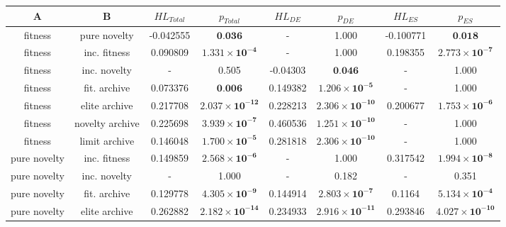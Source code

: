 \begin{tabular}{cccccccc}
\toprule
              A &               B & ${HL}_{Total}$ &                      $p_{Total}$ & ${HL}_{DE}$ &                         $p_{DE}$ & ${HL}_{ES}$ &                         $p_{ES}$ \\
\midrule
        fitness &    pure novelty &      -0.042555 &                 $\textbf{0.036}$ &           - &                            1.000 &   -0.100771 &                 $\textbf{0.018}$ \\
        fitness &    inc. fitness &       0.090809 &  $\mathbf{1.331 \times 10^{-4}}$ &           - &                            1.000 &    0.198355 &  $\mathbf{2.773 \times 10^{-7}}$ \\
        fitness &    inc. novelty &              - &                            0.505 &    -0.04303 &                 $\textbf{0.046}$ &           - &                            1.000 \\
        fitness &    fit. archive &       0.073376 &                 $\textbf{0.006}$ &    0.149382 &  $\mathbf{1.206 \times 10^{-5}}$ &           - &                            1.000 \\
        fitness &   elite archive &       0.217708 & $\mathbf{2.037 \times 10^{-12}}$ &    0.228213 & $\mathbf{2.306 \times 10^{-10}}$ &    0.200677 &  $\mathbf{1.753 \times 10^{-6}}$ \\
        fitness & novelty archive &       0.225698 &  $\mathbf{3.939 \times 10^{-7}}$ &    0.460536 & $\mathbf{1.251 \times 10^{-10}}$ &           - &                            1.000 \\
        fitness &   limit archive &       0.146048 &  $\mathbf{1.700 \times 10^{-5}}$ &    0.281818 & $\mathbf{2.306 \times 10^{-10}}$ &           - &                            1.000 \\
   pure novelty &    inc. fitness &       0.149859 &  $\mathbf{2.568 \times 10^{-6}}$ &           - &                            1.000 &    0.317542 &  $\mathbf{1.994 \times 10^{-8}}$ \\
   pure novelty &    inc. novelty &              - &                            1.000 &           - &                            0.182 &           - &                            0.351 \\
   pure novelty &    fit. archive &       0.129778 &  $\mathbf{4.305 \times 10^{-9}}$ &    0.144914 &  $\mathbf{2.803 \times 10^{-7}}$ &      0.1164 &  $\mathbf{5.134 \times 10^{-4}}$ \\
   pure novelty &   elite archive &       0.262882 & $\mathbf{2.182 \times 10^{-14}}$ &    0.234933 & $\mathbf{2.916 \times 10^{-11}}$ &    0.293846 & $\mathbf{4.027 \times 10^{-10}}$ \\

\end{tabular}
